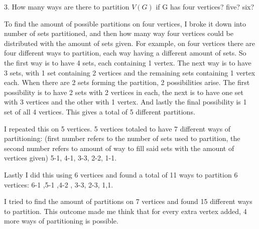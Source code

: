 \documentclass[12pt]{article}
\begin{document}
{
3. How many ways are there to partition $V(G)$ if G has four vertices? five? six?

To find the amount of possible partitions on four vertices, I broke it down into number of sets partitioned, and then how many way four vertices could be distributed with the amount of sets given.  For example, on four vertices there are four different ways to partition, each way having a different amount of sets. So the first way is to have 4 sets, each containing 1 vertex.  The next way is to have 3 sets, with 1 set containing 2 vertices and the remaining sets containing 1 vertex each.  When there are 2 sets forming the partition, 2 possibilities arise. The first possibility is to have 2 sets with 2 vertices in each, the next is to have one set with 3 vertices and the other with 1 vertex.  And lastly the final possibility is 1 set of all 4 vertices. This gives a total of 5 different partitions.

I repeated this on 5 vertices. 5 vertices totaled to have 7 different ways of partitioning: (first number refers to the number of sets used to partition, the second number refers to amount of way to fill said sets with the amount of vertices given) 5-1, 4-1, 3-3, 2-2, 1-1. 
 
 Lastly I did this using 6 vertices and found a total of 11 ways to partition 6 vertices: 6-1 ,5-1 ,4-2 , 3-3, 2-3, 1,1.
 
 I tried to find the amount of partitions on 7 vertices and found 15 different ways to partition. This outcome made me think that for every extra vertex added, 4 more ways of partitioning is possible.  



}
\end{document}
